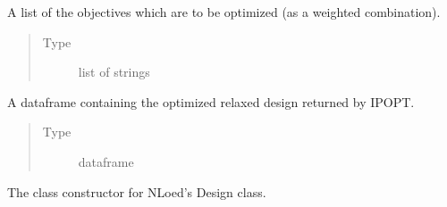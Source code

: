 \documentclass[letterpaper,10pt,english,openany,oneside]{sphinxmanual}
\begin{document}
\begin{fulllineitems}
\begin{fulllineitems}
\begin{quote}
\begin{description}
\end{description}\end{quote}

\end{fulllineitems}


\begin{fulllineitems}
\label{\detokenize{nloed:nloed.design.Design.objective_list}}
A list of the objectives which are to be optimized (as
a weighted combination).
\begin{quote}\begin{description}
\item[{Type}] \leavevmode
list of strings

\end{description}\end{quote}

\end{fulllineitems}


\begin{fulllineitems}
\label{\detokenize{nloed:nloed.design.Design.approximate_design}}
A dataframe containing the optimized relaxed design returned
by IPOPT.
\begin{quote}\begin{description}
\item[{Type}] \leavevmode
dataframe

\end{description}\end{quote}

\end{fulllineitems}


\begin{fulllineitems}
\label{\detokenize{nloed:nloed.design.Design.__init__}}
The class constructor for NLoed’s Design class.


\end{fulllineitems}
\end{fulllineitems}
\end{document}

